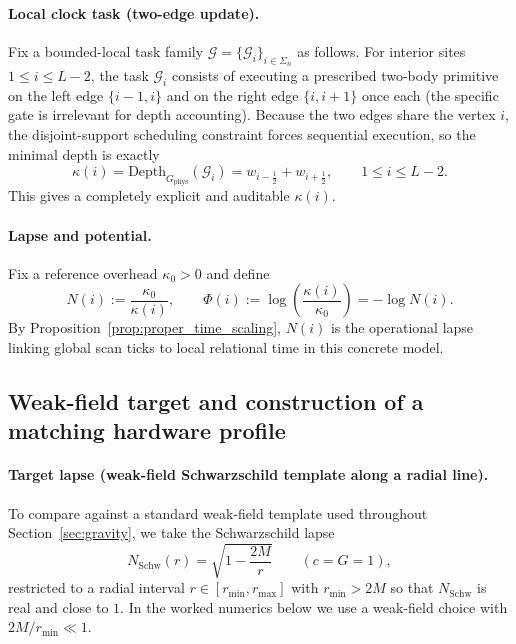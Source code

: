 \paragraph{Local clock task (two-edge update).}
Fix a bounded-local task family $\mathcal{G}=\{\mathcal{G}_i\}_{i\in\Sigma_n}$ as follows.
For interior sites $1\le i\le L-2$, the task $\mathcal{G}_i$ consists of executing a prescribed two-body primitive on the left edge $\{i-1,i\}$ and on the right edge $\{i,i+1\}$ once each (the specific gate is irrelevant for depth accounting).
Because the two edges share the vertex $i$, the disjoint-support scheduling constraint forces sequential execution, so the minimal depth is exactly
\begin{equation}
\label{eq:worked_1p1d_kappa_exact}
\kappa(i)=\mathrm{Depth}_{G_{\mathrm{phys}}}(\mathcal{G}_i)=w_{i-\frac12}+w_{i+\frac12},
\qquad 1\le i\le L-2.
\end{equation}
This gives a completely explicit and auditable $\kappa(i)$.

\paragraph{Lapse and potential.}
Fix a reference overhead $\kappa_0>0$ and define
\[
N(i):=\frac{\kappa_0}{\kappa(i)},
\qquad
\Phi(i):=\log\!\left(\frac{\kappa(i)}{\kappa_0}\right)=-\log N(i).
\]
By Proposition~\ref{prop:proper_time_scaling}, $N(i)$ is the operational lapse linking global scan ticks to local relational time in this concrete model.

\subsection{Weak-field target and construction of a matching hardware profile}
\label{app:worked_1p1d_target}

\paragraph{Target lapse (weak-field Schwarzschild template along a radial line).}
To compare against a standard weak-field template used throughout Section~\ref{sec:gravity}, we take the Schwarzschild lapse
\begin{equation}
\label{eq:worked_1p1d_schw_lapse}
N_{\mathrm{Schw}}(r)=\sqrt{1-\frac{2M}{r}}
\qquad (c=G=1),
\end{equation}
restricted to a radial interval $r\in[r_{\min},r_{\max}]$ with $r_{\min}>2M$ so that $N_{\mathrm{Schw}}$ is real and close to $1$.
In the worked numerics below we use a weak-field choice with $2M/r_{\min}\ll 1$.

